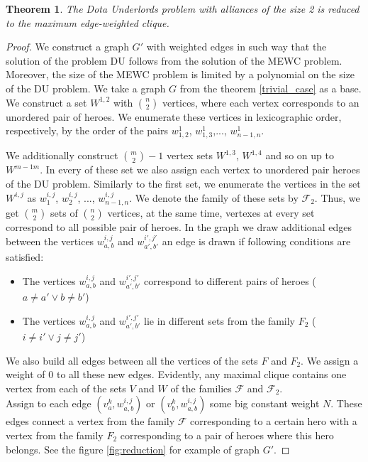 \documentclass{article}
\newtheorem{theorem}{Theorem}
\begin{document}
\begin{theorem}
\label{second_case}
    The Dota Underlords problem with alliances of the size 2 is reduced to the maximum edge-weighted clique.
\end{theorem}

\begin{proof}
We construct a graph $G'$ with weighted edges in such way that the solution of the problem DU follows from the solution of the MEWC problem. Moreover, the size of the MEWC problem is limited by a polynomial on the size of the DU problem. We take a graph $G$ from the theorem \ref{trivial_case} as a base. We construct a set $ W^{1,2} $ with $ \binom{n}{2} $ vertices, where each vertex corresponds to an unordered pair of heroes. We enumerate these vertices in lexicographic order, respectively, by the order of the pairs $ w_{1,2}^1 $, $w_{1,3}^1 $,..., $w_{n-1, n}^1$. 

    We additionally construct $\binom{m}{2}-1$ vertex sets $W^{1,3} $, $W^{1,4} $ and so on up to $W^{m-1 m}$. In every of these set we also assign each vertex to unordered pair heroes of the DU problem. Similarly to the first set, we enumerate the vertices in the set $W^{i, j} $ as $ w_1^{i, j} $, $ w_2^{i,j} $, ..., $ w_{n-1, n }^{i, j} $.   
   We denote the family of these sets by $\mathcal{F}_2 $. Thus, we get $ \binom {m}{2} $ sets of $ \binom{n}{2}$ vertices, at the same time, vertexes at every set correspond to all possible pair of heroes.    
    In the graph we draw additional edges between the vertices $ w_{a, b}^{i, j} $ and $w_{a',b'}^{i',j'} $ an edge is drawn if following conditions are satisfied:
    \begin{itemize}
        \item The vertices $ w_{a, b}^{i, j} $ and $w_ {a', b'}^{i',j'} $ correspond to different pairs of heroes ($ a \neq a '\lor b \neq b'$)
        \item The vertices $ w_ {a,b}^{i, j} $ and $w_{a', b'} ^{i', j'} $ lie in different sets from the family $ F_2 $ ($ i \neq i '\lor j \neq j' $)
    \end{itemize}
    
    We also build all edges between all the vertices of the sets $F$ and $F_2$. We assign a weight of 0 to all these new edges. Evidently, any maximal clique contains one vertex from each of the sets $V$ and $W$ of the families $ \mathcal {F} $ and $ \mathcal{F}_2 $. \\
    Assign to each edge  $ (v_a^k, w_{a,b}^{i, j}) $ or $ (v_b^k, w_{a,b}^{i,j}) $ some big constant weight $N$. These edges connect a vertex from the family $\mathcal{F}$ corresponding to a certain hero with a vertex from the family $ F_2 $ corresponding to a pair of heroes where this hero belongs. See the figure \ref{fig:reduction} for example of graph $G'$.
    

\end{proof}
\end{document}
